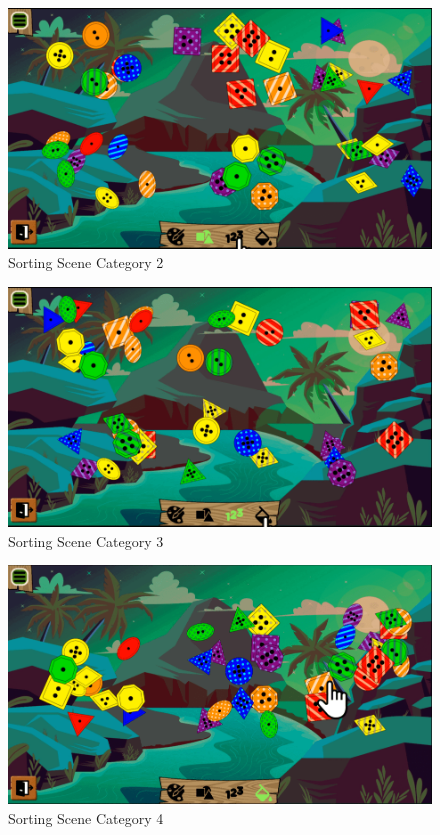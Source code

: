 \begin{figure}[H]
    \centering
    \includegraphics[width=1\textwidth]{figures/sortingscene3}
    \caption{Sorting Scene Category 2}
    \label{fig:sortingscene3}
\end{figure}

\begin{figure}[H]
    \centering
    \includegraphics[width=1\textwidth]{figures/sortingscene4}
    \caption{Sorting Scene Category 3}
    \label{fig:sortingscene4}
\end{figure}

\begin{figure}[H]
    \centering
    \includegraphics[width=1\textwidth]{figures/sortingscene5}
    \caption{Sorting Scene Category 4}
    \label{fig:sortingscene5}
\end{figure}

